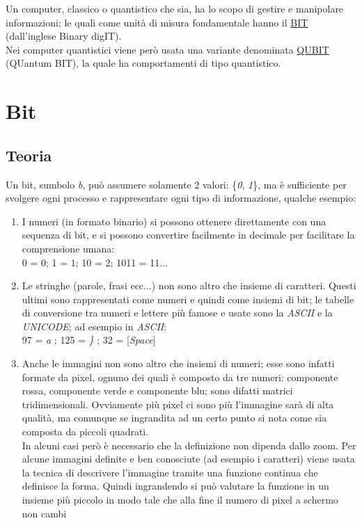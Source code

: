 Un computer, classico o quantistico che sia, ha lo scopo di gestire e manipolare informazioni; le quali come unità di misura fondamentale hanno il \underline{BIT} (dall'inglese Binary digIT).\\
Nei computer quantistici viene però usata una variante denominata \underline{QUBIT} (QUantum BIT), la quale ha comportamenti di tipo quantistico.
\section{Bit}
\subsection{Teoria}
Un bit, sumbolo \textit{b}, può assumere solamente 2 valori: \{\textit{0}, \textit{1}\}, ma è sufficiente per svolgere ogni processo e rappresentare ogni tipo di informazione, qualche esempio:
\begin{enumerate}
\item I numeri (in formato binario) si possono ottenere direttamente con una sequenza di bit, e si possono convertire facilmente in decimale per facilitare la comprensione umana:\\
\textsc{0 = 0}; \textsc{1 = 1}; \textsc{10 = 2}; \textsc{1011 = 11}...
\item Le stringhe (parole, frasi ecc...) non sono altro che insieme di caratteri. Questi ultimi sono rappresentati come numeri e quindi come insiemi di bit; le tabelle di conversione tra numeri e lettere più famose e usate sono la \textit{ASCII} e la \textit{UNICODE}; ad esempio in \textit{ASCII}:\\
97 = \textit{a} ; 125 = \textit{\}} ; 32 = [\textit{Space}]\\
\item Anche le immagini non sono altro che insiemi di numeri; esse sono infatti formate da pixel, ognuno dei quali è composto da tre numeri: componente rossa, componente verde e componente blu; sono difatti matrici tridimensionali. Ovviamente più pixel ci sono più l'immagine sarà di alta qualità, ma comunque se ingrandita ad un certo punto si nota come sia composta da piccoli quadrati.\\
In alcuni casi però è necessario che la definizione non dipenda dallo zoom. Per alcune immagini definite e ben conosciute (ad esempio i caratteri) viene usata la tecnica di descrivere l'immagine tramite una funzione continua che definisce la forma. Quindi ingrandendo si può valutare la funzione in un insieme più piccolo in modo tale che alla fine il numero di pixel a schermo non cambi
\end{enumerate}
